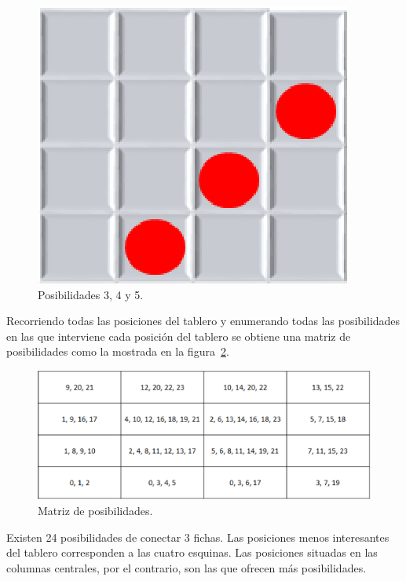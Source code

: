 \begin{figure}[h]
\begin{minipage}[t]{0.3\linewidth}
		\includegraphics[scale=0.5]{contenido/cap4/imagenes/posibilidadesConecta3_02b.eps}
	\end{minipage}
	\caption[Posibilidades en el Conecta-3 (II)]{Posibilidades 3, 4 y 5.}
	\label{fig:conecta3_posibilidades2}
\end{figure}

Recorriendo todas las posiciones del tablero y enumerando todas las posibilidades en las que interviene cada posición del tablero se obtiene una matriz de posibilidades como la mostrada en la figura~\ref{fig:conecta3_matrizPosibilidades}.

\begin{figure}[h]
	\centering
	\includegraphics[scale=0.6]{contenido/cap4/imagenes/matrizPosibilidades_Conecta3.eps}
	\caption{Matriz de posibilidades.}
	\label{fig:conecta3_matrizPosibilidades}
\end{figure}

Existen 24 posibilidades de conectar 3 fichas.
Las posiciones menos interesantes del tablero corresponden a las cuatro esquinas.
Las posiciones situadas en las columnas centrales, por el contrario, son las que ofrecen más posibilidades.

